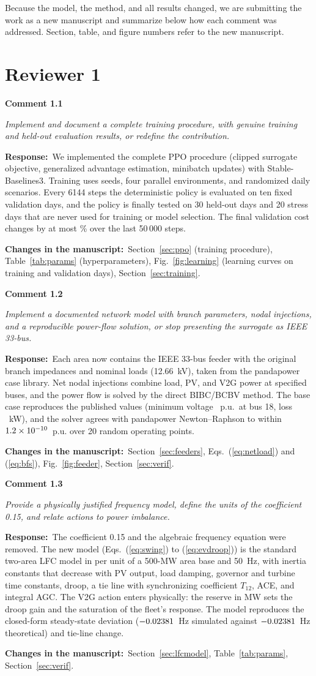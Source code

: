 \documentclass[10pt,a4paper]{article}
\newcommand{\rc}[1]{\par\noindent\textbf{Comment #1}\par}
\newcommand{\resp}{\par\noindent\textbf{Response:}\ }
\newcommand{\chg}{\par\noindent\textbf{Changes in the manuscript:}\ }
\begin{document}
Because the model, the method, and all results changed, we are
submitting the work as a new manuscript and summarize below how each
comment was addressed. Section, table, and figure numbers refer to the
new manuscript.

\section*{Reviewer 1}

\rc{1.1} \emph{Implement and document a complete training procedure,
with genuine training and held-out evaluation results, or redefine the
contribution.}
\resp We implemented the complete PPO procedure (clipped surrogate
objective, generalized advantage estimation, minibatch updates) with
Stable-Baselines3. Training uses \NSeed{} seeds, four parallel
environments, and randomized daily scenarios. Every 6144 steps the
deterministic policy is evaluated on ten fixed validation days, and
the policy is finally tested on 30 held-out days and 20 stress days
that are never used for training or model selection. The final
validation cost changes by at most \ConvChangePct\% over the last
50\,000 steps.
\chg Section~\ref{sec:ppo} (training procedure), Table~\ref{tab:params} (hyperparameters),
Fig.~\ref{fig:learning} (learning curves on training and validation days), Section~\ref{sec:training}.

\rc{1.2} \emph{Implement a documented network model with branch
parameters, nodal injections, and a reproducible power-flow solution,
or stop presenting the surrogate as IEEE 33-bus.}
\resp Each area now contains the IEEE 33-bus feeder with the original
branch impedances and nominal loads (12.66~kV), taken from the
pandapower case library. Net nodal injections combine load, PV, and V2G
power at specified buses, and the power flow is solved by the direct
BIBC/BCBV method. The base case reproduces the published values
(minimum voltage \ValVmin~p.u.\ at bus 18, loss \ValLoss~kW), and the
solver agrees with pandapower Newton--Raphson to within $1.2\times10^{-10}$~p.u.
over 20 random operating points.
\chg Section~\ref{sec:feeders}, Eqs.~(\ref{eq:netload}) and (\ref{eq:bfs}), Fig.~\ref{fig:feeder}, Section~\ref{sec:verif}.

\rc{1.3} \emph{Provide a physically justified frequency model, define
the units of the coefficient 0.15, and relate actions to power
imbalance.}
\resp The coefficient 0.15 and the algebraic frequency equation were
removed. The new model (Eqs.~(\ref{eq:swing}) to (\ref{eq:evdroop})) is the standard two-area LFC
model in per unit of a 500-MW area base and 50~Hz, with inertia
constants that decrease with PV output, load damping, governor and
turbine time constants, droop, a tie line with synchronizing
coefficient $T_{12}$, ACE, and integral AGC. The V2G action enters
physically: the reserve in MW sets the droop gain and the saturation
of the fleet's response. The model reproduces the closed-form
steady-state deviation ($-0.02381$~Hz simulated against $-0.02381$~Hz
theoretical) and tie-line change.
\chg Section~\ref{sec:lfcmodel}, Table~\ref{tab:params}, Section~\ref{sec:verif}.
\end{document}
